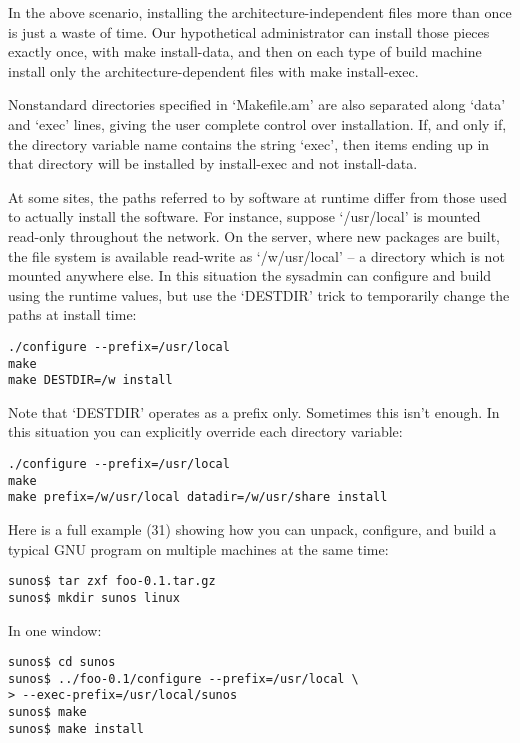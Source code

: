 In the above scenario, installing the architecture-independent files more than once is just a waste of time. Our hypothetical administrator can install those pieces exactly once, with make install-data, and then on each type of build machine install only the architecture-dependent files with make install-exec.

Nonstandard directories specified in `Makefile.am' are also separated along `data' and `exec' lines, giving the user complete control over installation. If, and only if, the directory variable name contains the string `exec', then items ending up in that directory will be installed by install-exec and not install-data.

At some sites, the paths referred to by software at runtime differ from those used to actually install the software. For instance, suppose `/usr/local' is mounted read-only throughout the network. On the server, where new packages are built, the file system is available read-write as `/w/usr/local' -- a directory which is not mounted anywhere else. In this situation the sysadmin can configure and build using the runtime values, but use the `DESTDIR' trick to temporarily change the paths at install time: 

\begin{Verbatim}[frame=single]
./configure --prefix=/usr/local
make
make DESTDIR=/w install
\end{Verbatim}

Note that `DESTDIR' operates as a prefix only. Sometimes this isn't enough. In this situation you can explicitly override each directory variable:

 	
\begin{Verbatim}[frame=single]
./configure --prefix=/usr/local
make
make prefix=/w/usr/local datadir=/w/usr/share install
\end{Verbatim}

Here is a full example (31) showing how you can unpack, configure, and build a typical GNU program on multiple machines at the same time:

\begin{Verbatim}[frame=single]
sunos$ tar zxf foo-0.1.tar.gz
sunos$ mkdir sunos linux
\end{Verbatim}

In one window:

\begin{Verbatim}[frame=single]
sunos$ cd sunos
sunos$ ../foo-0.1/configure --prefix=/usr/local \
> --exec-prefix=/usr/local/sunos
sunos$ make
sunos$ make install
\end{Verbatim}

